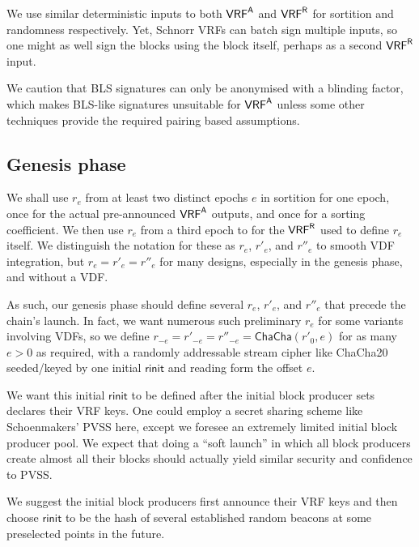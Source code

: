 We use similar deterministic inputs to both $\mathsf{VRF}^{\mathsf{A}}$ and $\mathsf{VRF}^{\mathsf{R}}$ for sortition and randomness respectively.  Yet, Schnorr VRFs \cite{NSEC5,schnorrkel} can batch sign multiple inputs, so one might as well sign the blocks using the block itself, perhaps as a second $\mathsf{VRF}^{\mathsf{R}}$ input. 

We caution that BLS signatures can only be anonymised with a blinding factor, which makes BLS-like signatures unsuitable for $\mathsf{VRF}^{\mathsf{A}}$ unless some other techniques provide the required pairing based assumptions.

\subsection{Genesis phase}\label{subsec:genesis_phase}

We shall use $r_e$ from at least two distinct epochs $e$ in sortition for one epoch, once for the actual pre-announced $\mathsf{VRF}^{\mathsf{A}}$ outputs, and once for a sorting coefficient.  We then use $r_e$ from a third epoch to for the $\mathsf{VRF}^{\mathsf{R}}$ used to define $r_e$ itself.  We distinguish the notation for these as $r_e$, $r'_e$, and $r''_e$ to smooth VDF integration, but $r_e = r'_e = r''_e$ for many designs, especially in the genesis phase, and without a VDF.

As such, our genesis phase should define several $r_e$, $r'_e$, and $r''_e$ that precede the chain's launch.  In fact, we want numerous such preliminary $r_e$ for some variants involving VDFs, so we define $r_{-e} = r'_{-e} = r''_{-e} = \mathsf{ChaCha}(r'_0,e)$ for as many $e > 0$ as required, with a randomly addressable stream cipher like ChaCha20 seeded/keyed by one initial $\mathsf{rinit}$ and reading form the offset $e$.

We want this initial $\mathsf{rinit}$ to be defined after the initial block producer sets declares their VRF keys.  One could employ a secret sharing scheme like Schoenmakers' PVSS \cite{Schoenmakers_PVSS} here, except we foresee an extremely limited initial block producer pool.  We expect that doing a ``soft launch'' in which all block producers create almost all their blocks should actually yield similar security and confidence to PVSS. 

We suggest the initial block producers first announce their VRF keys and then choose $\mathsf{rinit}$ to be the hash of several established random beacons at some preselected points in the future.


